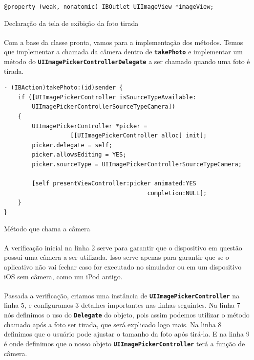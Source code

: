 \documentclass[a4paper,12pt,brazil,doubleside]{book}
\begin{document}
\begin{singlespace}
\begin{listing}[H]
\begin{verbatim}
@property (weak, nonatomic) IBOutlet UIImageView *imageView;
\end{verbatim}
\caption{Declaração da tela de exibição da foto tirada}
\end{listing}

\paragraph{}Com a base da classe pronta, vamos para a implementação dos métodos. Temos que implementar a chamada da câmera dentro de \texttt{\textbf{takePhoto}} e implementar um método do \texttt{\textbf{UIImagePickerControllerDelegate}} a ser chamado quando uma foto é tirada.

\begin{listing}[H]
\begin{verbatim}
- (IBAction)takePhoto:(id)sender {
    if ([UIImagePickerController isSourceTypeAvailable:
        UIImagePickerControllerSourceTypeCamera])
    {
        UIImagePickerController *picker =
                   [[UIImagePickerController alloc] init];
        picker.delegate = self;
        picker.allowsEditing = YES;
        picker.sourceType = UIImagePickerControllerSourceTypeCamera;
        
        [self presentViewController:picker animated:YES
                                         completion:NULL];
    }
}
\end{verbatim}
\caption{Método que chama a câmera}
\end{listing}

\paragraph{}A verificação inicial na linha 2 serve para garantir que o dispositivo em questão possui uma câmera a ser utilizada. Isso serve apenas para garantir que se o aplicativo não vai fechar caso for executado no simulador ou em um dispositivo iOS sem câmera, como um iPod antigo.
\paragraph{}Passada a verificação, criamos uma instância de \texttt{\textbf{UIImagePickerController}} na linha 5, e configuramos 3 detalhes importantes nas linhas seguintes. Na linha 7 nós definimos o uso do \texttt{\textbf{Delegate}} do objeto, pois assim podemos utilizar o método chamado após a foto ser tirada, que será explicado logo mais. Na linha 8 definimos que o usuário pode ajustar o tamanho da foto após tirá-la. E na linha 9 é onde definimos que o nosso objeto \texttt{\textbf{UIImagePickerController}} terá a função de câmera.

\end{singlespace}
\end{document}
